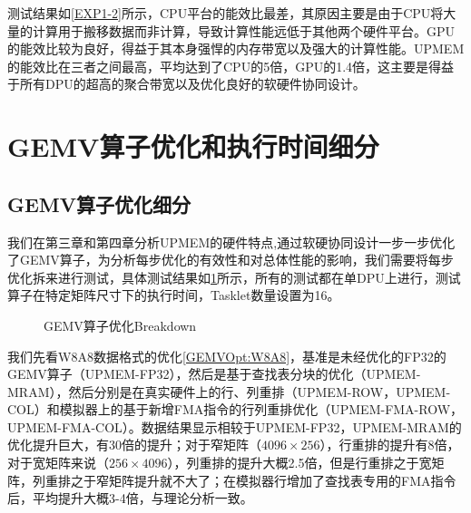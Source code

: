 测试结果如\ref{EXP1-2}所示，CPU平台的能效比最差，其原因主要是由于CPU将大量的计算用于搬移数据而非计算，导致计算性能远低于其他两个硬件平台。GPU的能效比较为良好，得益于其本身强悍的内存带宽以及强大的计算性能。UPMEM的能效比在三者之间最高，平均达到了CPU的5倍，GPU的1.4倍，这主要是得益于所有DPU的超高的聚合带宽以及优化良好的软硬件协同设计。

\section{GEMV算子优化和执行时间细分}
\subsection{GEMV算子优化细分}
我们在第三章和第四章分析UPMEM的硬件特点,通过软硬协同设计一步一步优化了GEMV算子，为分析每步优化的有效性和对总体性能的影响，我们需要将每步优化拆来进行测试，具体测试结果如\ref{GEMVOpt}所示，所有的测试都在单DPU上进行，测试算子在特定矩阵尺寸下的执行时间，Tasklet数量设置为16。

\begin{figure}[htbp]
	\centering
    \label{GEMVOpt} %
	\caption{GEMV算子优化Breakdown}
\end{figure}

我们先看W8A8数据格式的优化\ref{GEMVOpt:W8A8}，基准是未经优化的FP32的GEMV算子（UPMEM-FP32），然后是基于查找表分块的优化（UPMEM-MRAM），然后分别是在真实硬件上的行、列重排（UPMEM-ROW，UPMEM-COL）和模拟器上的基于新增FMA指令的行列重排优化（UPMEM-FMA-ROW，UPMEM-FMA-COL）。数据结果显示相较于UPMEM-FP32，UPMEM-MRAM的优化提升巨大，有30倍的提升；对于窄矩阵（$4096\times 256$），行重排的提升有8倍，对于宽矩阵来说（$256\times 4096$），列重排的提升大概2.5倍，但是行重排之于宽矩阵，列重排之于窄矩阵提升就不大了；在模拟器行增加了查找表专用的FMA指令后，平均提升大概3-4倍，与理论分析一致。

